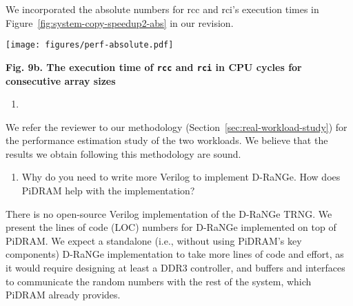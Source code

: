 We incorporated the absolute numbers for rcc and rci’s execution times in Figure~\ref{fig:system-copy-speedup2-abs}  in our revision.


\vspace{5pt}
\yyboxbegin

         \texttt{[image: figures/perf-absolute.pdf]}
         \centering
         
         \textbf{Fig. 9b. The execution time of \texttt{rcc} and \texttt{rci} in CPU cycles for consecutive array sizes}
\yyboxend 

\newpage
\begin{tcolorbox}
    \begin{enumerate}[label=R4/\arabic*]
        \addtocounter{enumi}{11}
        \item \label{q:r4q12} 
    \end{enumerate}
\end{tcolorbox} 

 We refer the reviewer to our methodology (Section~\ref{sec:real-workload-study}) for the performance estimation study of the two workloads. We believe that the results we obtain following this methodology are sound.

\bigbreak
\begin{tcolorbox}
    \begin{enumerate}[label=R4/\arabic*]
        \addtocounter{enumi}{12}
        \item \label{q:r4q13} Why do you need to write more Verilog to implement D-RaNGe. How does PiDRAM help with the implementation?
    \end{enumerate}
\end{tcolorbox} 

There is no open-source Verilog implementation of the D-RaNGe TRNG. We present the lines of code (LOC) numbers for D-RaNGe implemented on top of PiDRAM. We expect a standalone (i.e., without using PiDRAM’s key components) D-RaNGe implementation to take  more lines of code and effort, as it would require designing at least a DDR3 controller, and buffers and interfaces to communicate the random numbers with the rest of the system, which PiDRAM already provides. 


